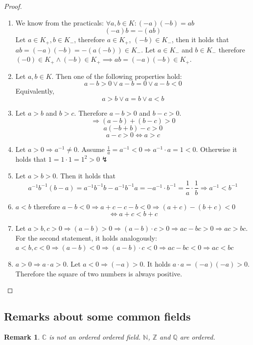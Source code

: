 \documentclass[a4paper,landscape,twocolumn]{article}
\newtheorem{rem}{Remark}
\begin{document}
\begin{proof}
  \begin{enumerate}
    \item We know from the practicals: $\forall a,b \in K: (-a)(-b) = ab$
      \[ (-a) b = -(ab) \]
      Let $a \in K_+, b \in K_-$, therefore $a \in K_+$, $(-b) \in K_-$,
      then it holds that $ab = (-a)(-b) = -(a(-b)) \in K_-$.
      Let $a \in K_-$ and $b \in K_-$ therefore $(-0) \in K_+ \land (-b) \in K_+
      \implies ab = (-a)(-b) \in K_+$.
    \item Let $a, b \in K$. Then one of the following properties hold:
      \[ a - b > 0 \lor a - b = 0 \lor a - b < 0 \]
      Equivalently,
      \[ a > b \lor a = b \lor a < b \]
    \item Let $a > b$ and $b > c$. Therefore $a - b > 0$ and $b - c > 0$.
      \[ \Rightarrow (a - b) + (b - c) > 0 \]
      \[ a(- b + b) - c > 0 \]
      \[ a - c > 0 \Leftrightarrow a > c \]
    \item Let $a > 0 \Rightarrow a^{-1} \neq 0$.
      Assume $\frac{1}{a} = a^{-1} < 0 \Rightarrow a^{-1} \cdot a = 1 < 0$.
      Otherwise it holds that $1 = 1 \cdot 1 = 1^2 > 0 \lightning$
    \item Let $a > b > 0$. Then it holds that
      \[
          a^{-1} b^{-1} (b - a)
          = a^{-1} b^{-1} b - a^{-1} b^{-1} a
          = -a^{-1} \cdot b^{-1}
          = \frac1a \cdot \frac1b
          \Rightarrow a^{-1} < b^{-1}
      \]
    \item $a < b$ therefore $a - b < 0 \Rightarrow a + c - c - b < 0 \Rightarrow (a + c) - (b + c) < 0$
      \[ \Leftrightarrow a + c < b + c \]
    \item Let $a > b, c > 0 \Rightarrow (a - b) > 0 \Rightarrow (a - b) \cdot c > 0 \Rightarrow ac - bc > 0
      \Rightarrow ac > bc$. For the second statement, it holds analogously:
      $a < b, c < 0 \Rightarrow (a - b) < 0 \Rightarrow (a - b) \cdot c < 0 \Rightarrow ac - bc < 0
        \Rightarrow ac < bc$
    \item $a > 0 \Rightarrow a \cdot a > 0$.
      Let $a < 0 \Rightarrow (-a) > 0$. It holds $a \cdot a = (-a)(-a) > 0$.
      Therefore the square of two numbers is always positive.
  \end{enumerate}
\end{proof}

\subsection{Remarks about some common fields}
\begin{rem}
  $\mathbb{C}$ is not an ordered ordered field.
  $\mathbb{N}$, $\mathbb{Z}$ and $\mathbb{Q}$ are ordered.
\end{rem}
\end{document}

